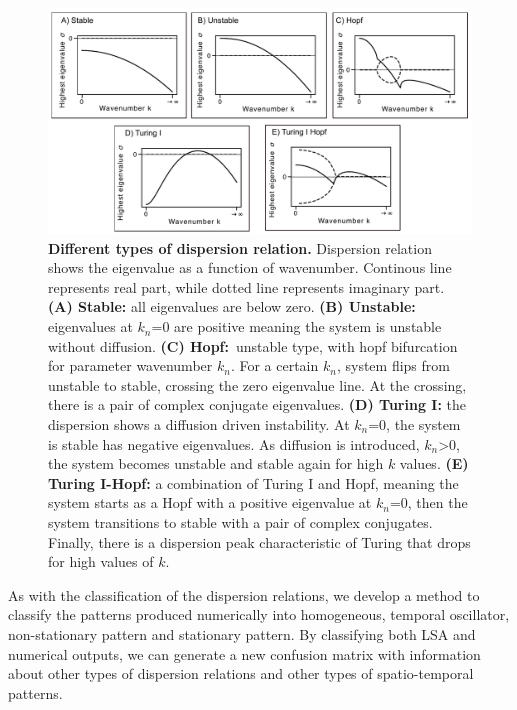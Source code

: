 
\begin{figure}[H] %
    \centering
    \includegraphics[width=1\textwidth]{chapters/Chapter 1/dispersions} %
    \caption{\textbf{Different types of dispersion relation.} Dispersion relation shows the eigenvalue as a function of wavenumber. Continous line represents real part, while dotted line represents imaginary part. \textbf{(A) Stable:} all eigenvalues are below zero. \textbf{(B) Unstable:} eigenvalues at $k_{n}$=0 are positive meaning the system is unstable without diffusion. \textbf{(C) Hopf:}~unstable type, with hopf bifurcation for parameter wavenumber $k_{n}$. For a certain $k_{n}$, system flips from unstable to stable, crossing the zero eigenvalue line. At the crossing, there is a pair of complex conjugate eigenvalues. \textbf{(D) Turing I:} the dispersion shows a diffusion driven instability. At $k_{n}$=0, the system is stable has negative eigenvalues. As diffusion is introduced, $k_{n}$>0, the system becomes unstable and stable again for high $k$ values. \textbf{(E) Turing I-Hopf:} a combination of Turing I and Hopf, meaning the system starts as a Hopf with a positive eigenvalue at $k_{n}$=0, then the system transitions to stable with a pair of complex conjugates. Finally, there is a dispersion peak characteristic of Turing that drops for high values of $k$.}
    \label{fig:dispersions} %
\end{figure}

As with the classification of the dispersion relations, we develop a method to classify the patterns produced numerically into homogeneous, temporal oscillator, non-stationary pattern and stationary pattern.
By classifying both LSA and numerical outputs, we can generate a new confusion matrix with information about other types of dispersion relations and other types of spatio-temporal patterns.

